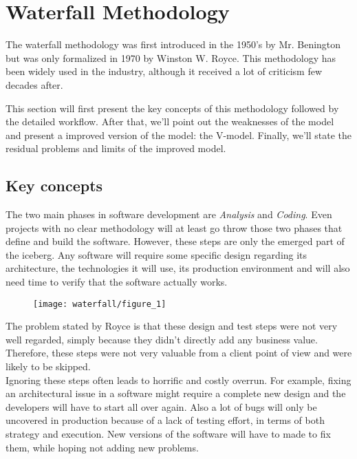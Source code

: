 \section{Waterfall Methodology}\label{sec:waterfall-methodology}
The waterfall methodology was first introduced in the 1950's by Mr.
Benington but was only formalized in 1970 by  Winston W. Royce.
This methodology has been widely used in the industry, although it received
a lot of criticism few decades after.

This section will first present the key concepts of this methodology followed
by the detailed workflow.
After that, we'll point out the weaknesses of the model and present a
improved version of the model: the V-model.
Finally, we'll state the residual problems and limits of the improved model.

\subsection{Key concepts}\label{subsec:key-concepts}

The two main phases in software development are \textit{Analysis} and
\textit{Coding}.
Even projects with no clear methodology will at least go throw those two phases
that define and build the software.
However, these steps are only the emerged part of the iceberg.
Any software will require some specific design regarding its architecture, the
technologies it will use, its production environment and will also need time
to verify that the software actually works.


\begin{figure}
    \texttt{[image: waterfall/figure\_1]}
    \centering
\end{figure}


The problem stated by Royce is that these design and test steps were not very
well regarded, simply because they didn't directly add any business value.
Therefore, these steps were not very valuable from a client point of view and
were likely to be skipped. \\
Ignoring these steps often leads to horrific and costly overrun.
For example, fixing an architectural issue in a software might require a
complete new design and the developers will have to start all over again.
Also a lot of bugs will only be uncovered in production because of a lack
of testing effort, in terms of both strategy and execution.
New versions of the software will have to made to fix them, while hoping not
adding new problems.

